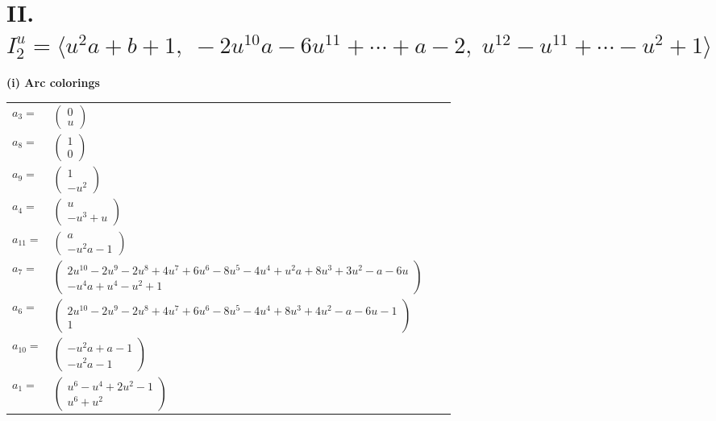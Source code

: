\documentclass[1p]{elsarticle_modified}
\theoremstyle{definition}
\begin{document}
\centering \section*{II. $I^u_{2}= \langle u^2 a+b+1,\;-2 u^{10} a-6 u^{11}+\cdots+a-2,\;u^{12}- u^{11}+\cdots- u^2+1 \rangle$}
\flushleft \textbf{(i) Arc colorings}\\
\begin{tabular}{m{7pt} m{180pt} m{7pt} m{180pt} }
\flushright $a_{3}=$&$\begin{pmatrix}0\\u\end{pmatrix}$ \\
\flushright $a_{8}=$&$\begin{pmatrix}1\\0\end{pmatrix}$ \\
\flushright $a_{9}=$&$\begin{pmatrix}1\\- u^2\end{pmatrix}$ \\
\flushright $a_{4}=$&$\begin{pmatrix}u\\- u^3+u\end{pmatrix}$ \\
\flushright $a_{11}=$&$\begin{pmatrix}a\\- u^2 a-1\end{pmatrix}$ \\
\flushright $a_{7}=$&$\begin{pmatrix}2 u^{10}-2 u^9-2 u^8+4 u^7+6 u^6-8 u^5-4 u^4+u^2 a+8 u^3+3 u^2- a-6 u\\- u^4 a+u^4- u^2+1\end{pmatrix}$ \\
\flushright $a_{6}=$&$\begin{pmatrix}2 u^{10}-2 u^9-2 u^8+4 u^7+6 u^6-8 u^5-4 u^4+8 u^3+4 u^2- a-6 u-1\\1\end{pmatrix}$ \\
\flushright $a_{10}=$&$\begin{pmatrix}- u^2 a+a-1\\- u^2 a-1\end{pmatrix}$ \\
\flushright $a_{1}=$&$\begin{pmatrix}u^6- u^4+2 u^2-1\\u^6+u^2\end{pmatrix}$ \\

\end{tabular}
\end{document}
